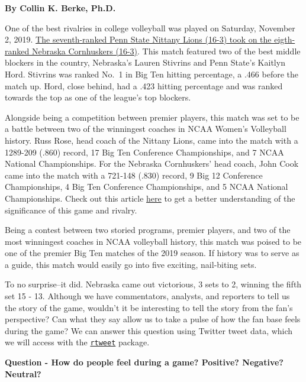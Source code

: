 \documentclass[
]{book}
\begin{document}
\textbf{By Collin K. Berke, Ph.D.}

One of the best rivalries in college volleyball was played on Saturday, November 2, 2019. \href{https://journalstar.com/sports/huskers/volleyball/john-cook-on-the-radio-nebraska-penn-state-match-will/article_c1d5c426-e136-5ef2-b589-510a0f17da82.html}{The seventh-ranked Penn State Nittany Lions (16-3) took on the eigth-ranked Nebraska Cornhuskers (16-3)}. This match featured two of the best middle blockers in the country, Nebraska's Lauren Stivrins and Penn State's Kaitlyn Hord. Stivrins was ranked No.~1 in Big Ten hitting percentage, a .466 before the match up. Hord, close behind, had a .423 hitting percentage and was ranked towards the top as one of the league's top blockers.

Alongside being a competition between premier players, this match was set to be a battle between two of the winningest coaches in NCAA Women's Volleyball history. Russ Rose, head coach of the Nittany Lions, came into the match with a 1289-209 (.860) record, 17 Big Ten Conference Championships, and 7 NCAA National Championships. For the Nebraska Cornhuskers' head coach, John Cook came into the match with a 721-148 (.830) record, 9 Big 12 Conference Championships, 4 Big Ten Conference Championships, and 5 NCAA National Championships. Check out this article \href{https://www.ncaa.com/news/volleyball-women/article/2019-10-29/no-7-penn-state-vs-no-8-nebraska-volleyball-preview}{here} to get a better understanding of the significance of this game and rivalry.

Being a contest between two storied programs, premier players, and two of the most winningest coaches in NCAA volleyball history, this match was poised to be one of the premier Big Ten matches of the 2019 season. If history was to serve as a guide, this match would easily go into five exciting, nail-biting sets.

To no surprise--it did. Nebraska came out victorious, 3 sets to 2, winning the fifth set 15 - 13. Although we have commentators, analysts, and reporters to tell us the story of the game, wouldn't it be interesting to tell the story from the fan's perspective? Can what they say allow us to take a pulse of how the fan base feels during the game? We can answer this question using Twitter tweet data, which we will access with the \href{https://rtweet.info/}{\texttt{rtweet}} package.

\textbf{Question - How do people feel during a game? Positive? Negative? Neutral?}
\end{document}
